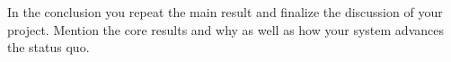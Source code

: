 \documentclass[a4paper,12pt,oneside]{report}
\begin{document}

In the conclusion you repeat the main result and finalize the discussion of
your project. Mention the core results and why as well as how your system
advances the status quo.

\cleardoublepage
{}
{}
\printbibliography

%
%
\end{document}
